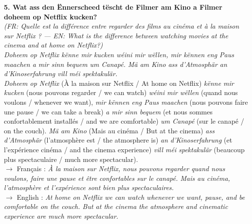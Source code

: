 \noindent\textbf{5. Wat ass den Ënnerscheed tëscht de Filmer am Kino a Filmer doheem op Netflix kucken?}\\
\textit{(FR: Quelle est la différence entre regarder des films au cinéma et à la maison sur Netflix ? — EN: What is the difference between watching movies at the cinema and at home on Netflix?)}\\[0.3em]
\textit{Doheem op Netflix kënne mir kucken wéini mir wëllen, mir kënnen eng Paus maachen a mir sinn bequem um Canapé. Mä am Kino ass d'Atmosphär an d'Kinoserfahrung vill méi spektakulär.}\\
\textit{Doheem op Netflix} (À la maison sur Netflix / At home on Netflix) \textit{kënne mir kucken} (nous pouvons regarder / we can watch) \textit{wéini mir wëllen} (quand nous voulons / whenever we want), \textit{mir kënnen eng Paus maachen} (nous pouvons faire une pause / we can take a break) \textit{a mir sinn bequem} (et nous sommes confortablement installés / and we are comfortable) \textit{um Canapé} (sur le canapé / on the couch). \textit{Mä am Kino} (Mais au cinéma / But at the cinema) \textit{ass d'Atmosphär} (l'atmosphère est / the atmosphere is) \textit{an d'Kinoserfahrung} (et l'expérience cinéma / and the cinema experience) \textit{vill méi spektakulär} (beaucoup plus spectaculaire / much more spectacular).\\
$\rightarrow$ Français : \textit{À la maison sur Netflix, nous pouvons regarder quand nous voulons, faire une pause et être confortables sur le canapé. Mais au cinéma, l'atmosphère et l'expérience sont bien plus spectaculaires.}\\
$\rightarrow$ English : \textit{At home on Netflix we can watch whenever we want, pause, and be comfortable on the couch. But at the cinema the atmosphere and cinematic experience are much more spectacular.}\\[0.8em]

